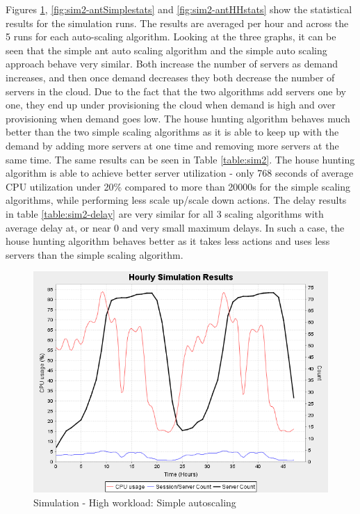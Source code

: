\documentclass[conference]{IEEEtran}
\begin{document}
Figures \ref{fig:sim2-basestats}, \ref{fig:sim2-antSimplestats} and \ref{fig:sim2-antHHstats} show the statistical results for the simulation runs. The results are averaged per hour and across the 5 runs for each auto-scaling algorithm. Looking at the three graphs, it can be seen that the simple ant auto scaling algorithm and the simple auto scaling approach behave very similar. Both increase the number of servers as demand increases, and then once demand decreases they both decrease the number of servers in the cloud. Due to the fact that the two algorithms add servers one by one, they end up under provisioning the cloud when demand is high and over provisioning when demand goes low. The house hunting algorithm behaves much better than the two simple scaling algorithms as it is able to keep up with the demand by adding more servers at one time and removing more servers at the same time. The same results can be seen in Table \ref{table:sim2}. The house hunting algorithm is able to achieve better server utilization - only 768 seconds of average CPU utilization under 20\% compared to more than 20000s for the simple scaling algorithms, while performing less scale up/scale down actions. The delay results in table \ref{table:sim2-delay} are very similar for all 3 scaling algorithms with average delay at, or near 0 and very small maximum delays. In such a case, the house hunting algorithm behaves better as it takes less actions and uses less servers than the simple scaling algorithm.

\begin{figure}
	\centering
		\includegraphics[width=0.75\columnwidth]{results/sim2/sim2-basestats.png}
	\caption{Simulation - High workload: Simple autoscaling}
	\label{fig:sim2-basestats}
\end{figure}
\end{document}
